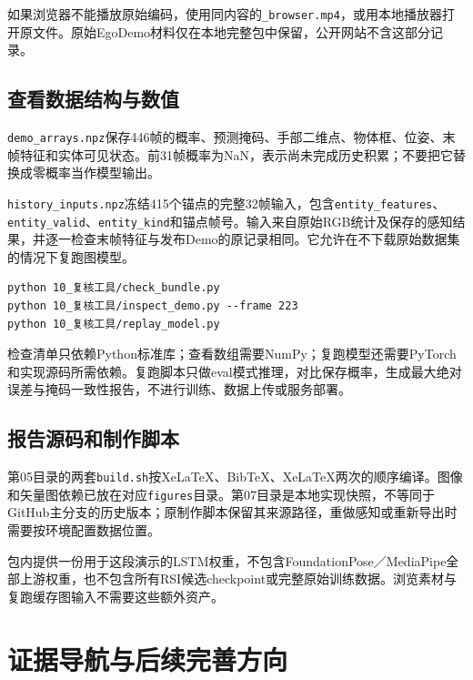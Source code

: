 \documentclass[11pt,a4paper,UTF8,fontset=fandol]{ctexart}
\newcommand{\code}[1]{{\small\nolinkurl{#1}}}
\begin{document}
如果浏览器不能播放原始编码，使用同内容的\code{_browser.mp4}，或用本地播放器打开原文件。原始EgoDemo材料仅在本地完整包中保留，公开网站不含这部分记录。

\subsection{查看数据结构与数值}
\code{demo_arrays.npz}保存446帧的概率、预测掩码、手部二维点、物体框、位姿、末帧特征和实体可见状态。前31帧概率为NaN，表示尚未完成历史积累；不要把它替换成零概率当作模型输出。

\code{history_inputs.npz}冻结415个锚点的完整32帧输入，包含\code{entity_features}、\code{entity_valid}、\code{entity_kind}和锚点帧号。输入来自原始RGB统计及保存的感知结果，并逐一检查末帧特征与发布Demo的原记录相同。它允许在不下载原始数据集的情况下复跑图模型。

\begin{Verbatim}[fontsize=\small,breaklines]
python 10_复核工具/check_bundle.py
python 10_复核工具/inspect_demo.py --frame 223
python 10_复核工具/replay_model.py
\end{Verbatim}
检查清单只依赖Python标准库；查看数组需要NumPy；复跑模型还需要PyTorch和实现源码所需依赖。复跑脚本只做eval模式推理，对比保存概率，生成最大绝对误差与掩码一致性报告，不进行训练、数据上传或服务部署。

\subsection{报告源码和制作脚本}
第05目录的两套\code{build.sh}按XeLaTeX、BibTeX、XeLaTeX两次的顺序编译。图像和矢量图依赖已放在对应\code{figures}目录。第07目录是本地实现快照，不等同于GitHub主分支的历史版本；原制作脚本保留其来源路径，重做感知或重新导出时需要按环境配置数据位置。

包内提供一份用于这段演示的LSTM权重，不包含FoundationPose／MediaPipe全部上游权重，也不包含所有RSI候选checkpoint或完整原始训练数据。浏览素材与复跑缓存图输入不需要这些额外资产。

\section{证据导航与后续完善方向}
\end{document}
